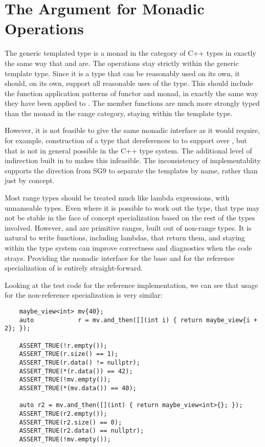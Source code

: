 \documentclass[a4paper,10pt,oneside,openany,final,article]{memoir}
\begin{document}
\section{The Argument for Monadic Operations}
The generic templated type  is a monad in the category of C++ types in exactly the same way that  and  are. \cite{P0798R8} The operations stay strictly within the generic template type. Since it is a type that can be reasonably used on its own, it should, on its own, support all reasonable uses of the type. This should include the function application patterns of functor and monad, in exactly the same way they have been applied to . The member functions are much more strongly typed than the monad in the range category, staying within the template type.

However, it is not feasible to give  the same monadic interface as it would require, for example, construction of a type that dereferences to  to support  over , but that is not in general possible in the C++ type system. The additional level of indirection built in to  makes this infeasible. The inconsistency of implementablity supports the direction from SG9 to separate the templates by name, rather than just by concept.

Most range types should be treated much like lambda expressions, with unnameable types. Even where it is possible to work out the type, that type may not be stable in the face of concept specialization based on the rest of the types involved. However,  and  are primitive ranges, built out of non-range types. It is natural to write functions, including lambdas, that return them, and staying within the type system can improve correctness and diagnostics when the code strays. Providing the monadic interface for the base and for the reference specialization of  is entirely straight-forward.

Looking at the test code for the reference implementation, we can see that usage for the non-reference specialization is very similar:

\begin{minipage}[t]{\linewidth}
  \begin{verbatim}
    maybe_view<int> mv{40};
    auto            r = mv.and_then([](int i) { return maybe_view{i + 2}; });

    ASSERT_TRUE(!r.empty());
    ASSERT_TRUE(r.size() == 1);
    ASSERT_TRUE(r.data() != nullptr);
    ASSERT_TRUE(*(r.data()) == 42);
    ASSERT_TRUE(!mv.empty());
    ASSERT_TRUE(*(mv.data()) == 40);

    auto r2 = mv.and_then([](int) { return maybe_view<int>{}; });
    ASSERT_TRUE(r2.empty());
    ASSERT_TRUE(r2.size() == 0);
    ASSERT_TRUE(r2.data() == nullptr);
    ASSERT_TRUE(!mv.empty());

  \end{verbatim}
\end{minipage}
\end{document}
